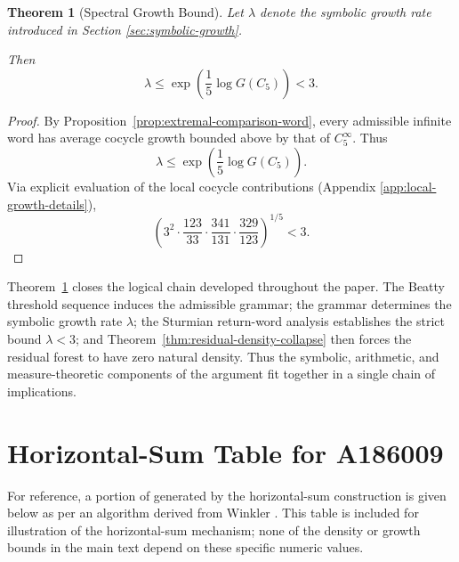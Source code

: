 \documentclass[12pt, oneside]{article}
\numberwithin{equation}{section}
\theoremstyle{definition}
\theoremstyle{plain}
\newtheorem{theorem}{Theorem}[section]
\theoremstyle{remark}
\begin{document}
\begin{theorem}[Spectral Growth Bound]
\label{thm:spectral-growth-bound}
Let $\lambda$ denote the symbolic growth rate introduced in Section
\ref{sec:symbolic-growth}.

Then
\[
\lambda \le \exp\!\left(\frac{1}{5}\log G(C_5)\right) < 3.
\]
\end{theorem}

\begin{proof}
By Proposition~\ref{prop:extremal-comparison-word}, every admissible infinite
word has average cocycle growth bounded above by that of \(C_5^\infty\).  Thus
\[
\lambda \le \exp\!\left(\frac{1}{5}\log G(C_5)\right).
\]
Via explicit evaluation of the local cocycle contributions (Appendix \ref{app:local-growth-details}),
\[
\left(
3^{2}
\cdot \frac{123}{33}
\cdot \frac{341}{131}
\cdot \frac{329}{123}
\right)^{1/5}
< 3.
\]
\end{proof}
Theorem~\ref{thm:spectral-growth-bound} closes the logical chain developed throughout
the paper. The Beatty threshold sequence induces the admissible grammar; the grammar
determines the symbolic growth rate \(\lambda\); the Sturmian return-word analysis
establishes the strict bound \(\lambda < 3\); and Theorem~\ref{thm:residual-density-collapse}
then forces the residual forest to have zero natural density. Thus the symbolic, arithmetic,
and measure-theoretic components of the argument fit together in a single chain of implications.


\newpage
\section{Horizontal-Sum Table for A186009}
\label{app:horizontal-sum-table}

For reference, a portion of  generated by the horizontal-sum construction is
given below as per an algorithm derived from Winkler \cite{Winkler2017}. This table is included
for illustration of the horizontal-sum mechanism; none of the density or growth bounds in the
main text depend on these specific numeric values.
\end{document}
